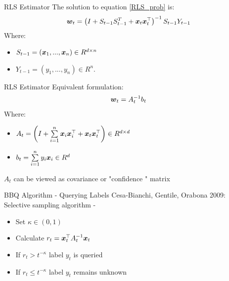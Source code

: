 \documentclass{beamer}
\begin{document}
\begin{frame}{RLS Estimator}
The solution to equation \ref{RLS_prob} is:\newline\newline
\begin{equation}
{\boldsymbol{w}}_{t}=\left(I+S_{t-1}S_{t-1}^T+ {\boldsymbol{x}}_{t} {{\boldsymbol{x}}}^{\top}_{t}\right)^{-1}S_{t-1}Y_{t-1}
\label{RLS}
\end{equation}
\newline
Where:\newline
\begin{itemize}
\item $S_{t-1}=({\boldsymbol{x}}_{1},...,{\boldsymbol{x}}_{n})\in R^{d\times n}$ \newline
\item $Y_{t-1}=(y_1,...,y_n)\in R^n$.
\end{itemize}
\end{frame}

\begin{frame}{RLS Estimator}
Equivalent formulation:
\begin{equation}
{\boldsymbol{w}}_{t}=A_{t}^{-1}b_t
\label{RLS2}
\end{equation}
Where:\newline
\begin{itemize} 
\item $A_t=\left(I+\sum\limits_{i=1}^{n}{\boldsymbol{x}}_{i} {{\boldsymbol{x}}}^{\top}_{i}+ {\boldsymbol{x}}_{t} {{\boldsymbol{x}}}^{\top}_{t}\right)\in R^{d\times d}$\newline
\item $b_t=\sum\limits_{i=1}^{n}y_i{\boldsymbol{x}}_{i}\in R^d$ \newline
\end{itemize}
$A_t$ can be viewed as covariance or "confidence " matrix
\end{frame}

\begin{frame}{BBQ Algorithm - Querying Labels}
Cesa-Bianchi, Gentile, Orabona 2009:
\newline\newline
Selective sampling algorithm -\newline
\begin{itemize}
\item Set $\kappa\in\left(0,1\right)$\newline
\item Calculate $r_t={{\boldsymbol{x}}}^{\top}_{t}A_{t}^{-1}{\boldsymbol{x}}_{t}$\newline
\item  If $r_t> t^{-\kappa}$ label $y_t$ is queried\newline
\item If $r_t\leq t^{-\kappa}$  label $y_t$ remains unknown
\end{itemize}
\end{frame}
\end{document}
